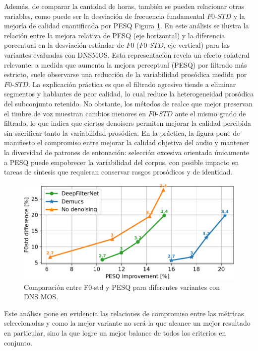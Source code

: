 Además, de comparar la cantidad de horas, también se pueden relacionar otras variables, como puede ser la desviación de frecuencia fundamental \(F0\text{-}STD\) y la mejoría de calidad cuantificada por PESQ Figura \ref{fig:F0_vs_PESQ}. En este análisis se ilustra la relación entre la mejora relativa de PESQ (eje horizontal) y la diferencia porcentual en la desviación estándar de \(F0\) (\(F0\text{-}STD\), eje vertical) para las variantes evaluadas con DNSMOS. Esta representación revela un efecto colateral relevante: a medida que aumenta la mejora perceptual (PESQ) por filtrado más estricto, suele observarse una reducción de la variabilidad prosódica medida por \(F0\text{-}STD\). La explicación práctica es que el filtrado agresivo tiende a eliminar segmentos y hablantes de peor calidad, lo cual reduce la heterogeneidad prosódica del subconjunto retenido. No obstante, los métodos de realce que mejor preservan el timbre de voz muestran cambios menores en \(F0\text{-}STD\) ante el mismo grado de filtrado, lo que indica que ciertos denoisers permiten mejorar la calidad percibida sin sacrificar tanto la variabilidad prosódica. En la práctica, la figura pone de manifiesto el compromiso entre mejorar la calidad objetiva del audio y mantener la diversidad de patrones de entonación: selección excesiva orientada únicamente a PESQ puede empobrecer la variabilidad del corpus, con posible impacto en tareas de síntesis que requieran conservar rasgos prosódicos y de identidad.

\begin{figure}[h]
  \centering
  \centerline{\includegraphics[width=12cm]{Figuras/Pipeline/F0 vs pesq.pdf}}
  \caption{Comparación entre F0-std y PESQ para diferentes variantes con DNS MOS.}
    \label{fig:F0_vs_PESQ}
\end{figure}

Este análisis pone en evidencia las relaciones de compromiso entre las métricas seleccionadas y como la mejor variante no será la que alcance un mejor resultado en particular, sino la que logre un mejor balance de todos los criterios en conjunto.

